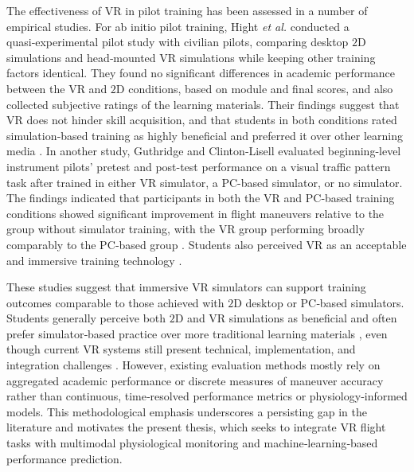 \documentclass[11pt, a4paper]{article}
\begin{document}
The effectiveness of VR in pilot training has been assessed in a number of empirical studies. For ab initio pilot training, Hight \emph{et al.} \cite{hight-2022} conducted a quasi‑experimental pilot study with civilian pilots, comparing desktop $2$D simulations and head‑mounted VR simulations while keeping other training factors identical. They found no significant differences in academic performance between the VR and $2$D conditions, based on module and final scores, and also collected subjective ratings of the learning materials. Their findings suggest that VR does not hinder skill acquisition, and that students in both conditions rated simulation‑based training as highly beneficial and preferred it over other learning media \cite{hight-2022}. In another study, Guthridge and Clinton‑Lisell \cite{guthridge-2023} evaluated beginning-level instrument pilots' pretest and post-test performance on a visual traffic pattern task after trained in either VR simulator, a PC-based simulator, or no simulator. The findings indicated that participants in both the VR and PC‑based training conditions showed significant improvement in flight maneuvers relative to the group without simulator training, with the VR group performing broadly comparably to the PC‑based group \cite{guthridge-2023}. Students also perceived VR as an acceptable and immersive training technology \cite{guthridge-2023}. 

These studies suggest that immersive VR simulators can support training outcomes comparable to those achieved with $2$D desktop or PC‑based simulators. Students generally perceive both $2$D and VR simulations as beneficial and often prefer simulator‑based practice over more traditional learning materials \cite{hight-2022,guthridge-2023}, even though current VR systems still present technical, implementation, and integration challenges \cite{pena-2025}. However, existing evaluation methods mostly rely on aggregated academic performance or discrete measures of maneuver accuracy rather than continuous, time‑resolved performance metrics or physiology‑informed models. This methodological emphasis underscores a persisting gap in the literature and motivates the present thesis, which seeks to integrate VR flight tasks with multimodal physiological monitoring and machine‑learning‑based performance prediction.
\end{document}
